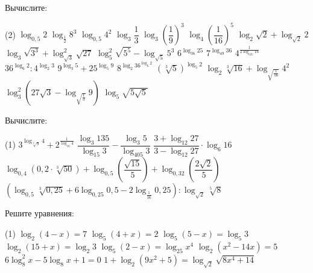 \begin{class}[number=2]
\begin{definit}
	\end{definit}
	\begin{listofex}[resume]
		\item Вычислите:
		\begin{tasks}(2)
			\task \( \log_{0,5}2 \)
			\task \( \log_{\frac{1}{2}}8^3 \)
			\task \( \log_{0,5}4^2 \)
			\task \( \log_3 \dfrac{1}{3} \)
			\task \( \log_3 \left(  \dfrac{1}{9} \right)^3 \)
			\task \( \log_4 \left(  \dfrac{1}{16} \right)^5 \)
			\task \( \log_2 \sqrt{2} + \log_{\sqrt{2}}2 \)
			\task \( \log_3 \sqrt{3^3} + \log^2_{\sqrt{3}}\sqrt{27} \)
			\task \( \log^2_5 \sqrt{5^5} - \log_{\sqrt{5}}5^3 \)
			\task \( 6^{\log_{36} 25} \)
			\task \( 7^{\log_{49} 36} \)
			\task \( 4^{\tfrac{1}{2\log_{625} 16 }} \)
			\task \( 36^{\log_6 2}:4^{\log_2 3} \)
			\task \( 9^{\log_3 5}+25^{\log_5 9} \)
			\task \( 8^{\log_2 36^{\log_6 2}} \)
			\task \( (\sqrt[3]{5})^{\log_5 2} \)
			\task \( \log_2 \sqrt[3]{16} + \log_{\sqrt{\frac{1}{16}}}4^{2} \)
			\task \( \log^2_3 (27\sqrt{3} - \log_{\sqrt{\frac{1}{3}}}9) \)
			\task \( \log_5 \sqrt{5\sqrt{5}} \)
		\end{tasks}
		\newpage
		\item Вычислите:
		\begin{tasks}(1)
			\task \( 3^{\log_{\sqrt[3]{9}}4} +2^{\tfrac{1}{\log_{16} 4}} \)
			\task \( \dfrac{\log_3 135}{\log_{15} 3} - \dfrac{\log_3 5}{\log_{405} 3} \)
			\task \( \dfrac{3+\log_{12}27}{3-\log_{12} 27} \cdot \log_6 16 \)
			\task \( \log_{0,4}(0,2 \cdot \sqrt[3]{50}) + \log_{0,5}\left( \dfrac{\sqrt{15}}{5} \right) + \log_{0,32} \left( \dfrac{2\sqrt{2}}{5} \right)  \)
			\task \( \left( \log_{0,5} \sqrt[3]{0,25} + 6\log_{0,25} 0,5 - 2 \log_{\frac{1}{16}}0,25 \right) : \log_{\sqrt{2}}\sqrt[5]{8} \)
		\end{tasks}
		
		\item Решите уравнения: %
		\begin{tasks}(1)
			\task \( \log_2 (4-x)=7 \)
			\task \( \log_5(4+x)=2 \)
			\task \( \log_5(5-x)=\log_5 3 \)
			\task \( \log_2(15+x)=\log_2 3 \)
			\task \( \log_5 (2-x) = \log_{25} x^4 \)
			\task \( \log_2 (x^2-14x)=5 \)
			\task \( 6 \log^2_8 x -5\log_8 x+1=0 \)
			\task \( 1+\log_2(9x^2+5)=\log_{\sqrt{2}} \sqrt{8x^4+14} \)
		\end{tasks}
	\end{listofex}
\end{class}

